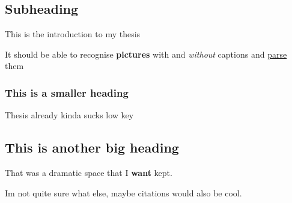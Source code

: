 \subsection{Subheading}

This is the introduction to my thesis \ 


It should be able to recognise \textbf{pictures} with and \textit{without} captions and \underline{parse} them \ 

\subsubsection{This is a smaller heading}

Thesis already kinda sucks low key\ 


\subsection{This is another big heading}





That was a dramatic space that I \textbf{want }kept. \ 




Im not quite sure what else, maybe citations would also be cool.\
